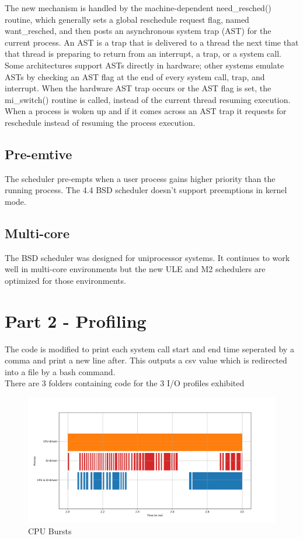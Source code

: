 \documentclass[11pt]{article}
\begin{document}
The new mechanism is handled by the machine-dependent need\_resched() routine, which generally sets a global reschedule request flag, named want\_resched, and then posts an asynchronous system trap (AST) for the current process. An AST is a trap that is delivered to a thread the next time that that thread is preparing to return from an interrupt, a trap, or a system call. Some architectures support ASTs directly in hardware; other systems emulate ASTs by checking an AST flag at the end of every system call, trap, and interrupt. When the hardware AST trap occurs or the AST flag is set, the mi\_switch() routine is called, instead of the current thread resuming execution. When a process is woken up and if it comes across an AST trap it requests for reschedule instead of resuming the process execution.\\

\subsection{Pre-emtive}
\label{sec:orgdcf5a49}
The scheduler pre-empts when a user process gains higher priority than the running process. The 4.4 BSD scheduler doesn’t support preemptions in kernel mode.\\
\subsection{Multi-core}
\label{sec:org5377abc}
The BSD scheduler was designed for uniprocessor systems. It continues to work well in multi-core environments but the new ULE and M2 schedulers are optimized for those environments.\\


\section{Part 2 - Profiling}
\label{sec:orgfd3b1aa}
The code is modified to print each system call start and end time seperated by a comma and print a new line after. This outputs a csv value which is redirected into a file by a bash command.\\

There are 3 folders containing code for the 3 I/O profiles exhibited\\

\begin{figure}[htbp]
\centering
\includegraphics[width=.9\linewidth]{./Part2-CPUBursts.png}
\caption{CPU Bursts}
\end{figure}
\end{document}
